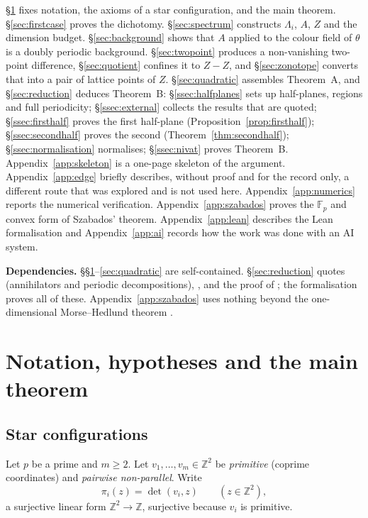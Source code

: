 \documentclass[11pt,reqno]{amsart}
\theoremstyle{plain}
\theoremstyle{definition}
\theoremstyle{remark}
\theoremstyle{plain}
\theoremstyle{remark}
\theoremstyle{definition}
\numberwithin{equation}{section}
\newcommand{\Z}{\mathbb{Z}}
\newcommand{\Fp}{\mathbb{F}_p}
\begin{document}
\S\ref{sec:notation} fixes notation, the axioms of a star configuration, and the
main theorem.  \S\ref{sec:firstcase} proves the dichotomy.
\S\ref{sec:spectrum} constructs $\Lambda_i$, $A$, $Z$ and the dimension budget.
\S\ref{sec:background} shows that $A$ applied to the colour field of $\theta$ is
a doubly periodic background.  \S\ref{sec:twopoint} produces a non-vanishing
two-point difference, \S\ref{sec:quotient} confines it to $Z-Z$, and
\S\ref{sec:zonotope} converts that into a pair of lattice points of $Z$.
\S\ref{sec:quadratic} assembles Theorem~A, and \S\ref{sec:reduction} deduces
Theorem~B: \S\ref{ssec:halfplanes} sets up half-planes, regions and full
periodicity; \S\ref{ssec:external} collects the results that are quoted;
\S\ref{ssec:firsthalf} proves the first half-plane
(Proposition~\ref{prop:firsthalf}); \S\ref{ssec:secondhalf} proves the second
(Theorem~\ref{thm:secondhalf});
\S\ref{ssec:normalisation} normalises; \S\ref{ssec:nivat} proves Theorem~B.
Appendix~\ref{app:skeleton} is a one-page skeleton of the argument.
Appendix~\ref{app:edge} briefly describes, without proof and for the record
only, a different route that was explored and is not used here.
Appendix~\ref{app:numerics} reports the numerical verification.
Appendix~\ref{app:szabados} proves the $\Fp$ and convex form of Szabados'
theorem.  Appendix~\ref{app:lean} describes the Lean formalisation and
Appendix~\ref{app:ai} records how the work was done with an AI system.

\smallskip\noindent\textbf{Dependencies.}
\S\S\ref{sec:notation}--\ref{sec:quadratic} are self-contained.
\S\ref{sec:reduction} quotes \cite{KS} (annihilators and periodic
decompositions), \cite[Theorem~1.9]{Colle23a}, and the proof of
\cite[Lemma~4.6]{Colle23a}; the formalisation proves all of these.
Appendix~\ref{app:szabados} uses nothing beyond the one-dimensional
Morse--Hedlund theorem \cite{MH38}.

\setcounter{section}{-1}
\section{Notation, hypotheses and the main theorem}\label{sec:notation}

\subsection{Star configurations}\label{ssec:star}

Let $p$ be a prime and $m\ge2$.  Let $v_1,\dots,v_m\in\Z^2$ be \emph{primitive}
(coprime coordinates) and \emph{pairwise non-parallel}.  Write
\[\pi_i(z)=\det(v_i,z)\qquad(z\in\Z^2),\]
a surjective linear form $\Z^2\to\Z$, surjective because $v_i$ is primitive.
\end{document}
